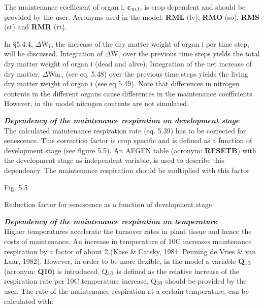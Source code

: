  
The maintenance coefficient of organ i, {\bf c$_{{\rm m,i}}$}, is crop dependent and should be provided by
the user. Acronyms used in the model: {\bf RML} (lv), {\bf RMO} (so), {\bf RMS} (st) and {\bf RMR} (rt).

In \S 5.4.4, $\Delta$W$_{{\rm i}}$, the increase of the dry matter weight of organ i per time step, will be
discussed. Integration of $\Delta$W$_{{\rm i}}$ over the previous time steps yields the total dry matter
weight of organ i (dead and alive). Integration of the net increase of dry matter, $\Delta$Wn$_{{\rm i}}$,
(see eq. 5.48) over the previous time steps yields the living dry matter weight of organ i
(see eq 5.49). Note that differences in nitrogen contents in the different organs cause
differ\-enc\-es in the mainte\-nance coefficients. However, in the model nitrogen contents are
not simulated.



{\bf {\it Dependency of the maintenance respiration on development stage\/}}\\
The calculated maintenance respiration rate (eq. 5.39) has to be corrected for senescence.
This correction factor is crop specific and is defined as a function of development stage
(see figure 5.5). An AFGEN table (acronym: {\bf RFSETB}) with the development stage as
independent variable, is used to describe this dependency. The maintenance respiration
should be multiplied with this factor\\
\begin{figure}[htbp]
\begin{forcewidth}{8.44cm}
 \begin{center} \end{center}
\end{forcewidth}
\end{figure}














Fig. 5.5
\testlastline

\begin{indenting}{2.54cm}
Reduc\-tion factor for senescence as a function of development stage
\end{indenting}
 {\bf {\it Dependency of the maintenance respiration on temperature\/}}\\
Higher temperatures accelerate the turnover rates in plant tissue and hence the costs of
mainten\-ance. An increase in temperature of 10\degrees C increases maintenance respira\-tion by a
factor of about 2 (Kase \& Catsky, 1984; Penning de Vries \& van Laar, 1982). However,
in order to be more flexible, in the model a variable {\bf Q$_{{\rm 10}}$} (acronym: {\bf Q10}) is introduced.
Q$_{{\rm 10}}$ is defined as the relative increase of the respiration rate per 10\degrees C temperature
increase. Q$_{{\rm 10}}$ should be provided by the user. The rate of the maintenance respiration at a
certain temperature, can be calculated with:

